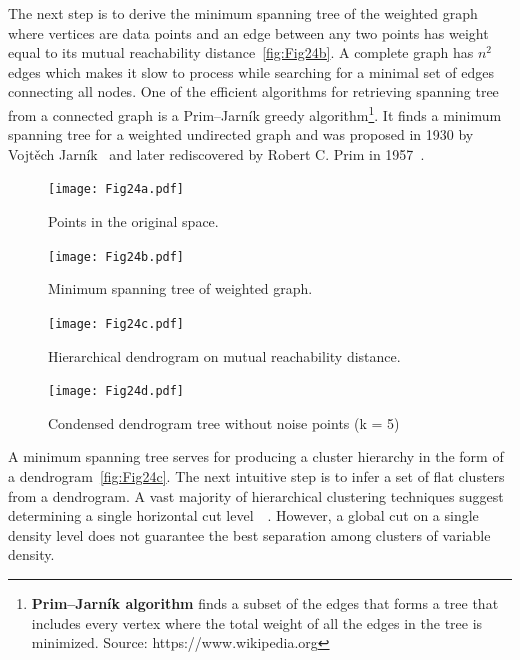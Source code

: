 The next step is to derive the minimum spanning tree of the weighted graph where vertices are data points and an edge between any two points has weight equal to its mutual reachability distance~\autoref{fig:Fig24b}. A complete graph has $n^2$ edges which makes it slow to process while searching for a minimal set of edges connecting all nodes. One of the efficient algorithms for retrieving spanning tree from a connected graph is a Prim–Jarník greedy algorithm\footnote{\textbf{Prim–Jarník algorithm} finds a subset of the edges that forms a tree that includes every vertex where the total weight of all the edges in the tree is minimized. Source: https://www.wikipedia.org}. It finds a minimum spanning tree for a weighted undirected graph and was proposed in 1930 by Vojtěch Jarník~\cite{Jarnik1930SpanningTree} and later rediscovered by Robert C. Prim in 1957~\cite{Prim1957SpanningTree}.

\begin{figure}[H]
    \centering
    \begin{minipage}{0.42\textwidth}
        \centering
        \texttt{[image: Fig24a.pdf]}
        \caption{Points in the original space.}
        \label{fig:Fig24a}
    \end{minipage}\hfill
    \begin{minipage}{0.42\textwidth}
        \centering
        \texttt{[image: Fig24b.pdf]} 
        \caption{Minimum spanning tree of weighted graph.}
        \label{fig:Fig24b}
    \end{minipage}
\end{figure}
\begin{figure}[H]
    \centering
    \begin{minipage}{0.42\textwidth}
        \centering
        \texttt{[image: Fig24c.pdf]}
        \caption{Hierarchical dendrogram on mutual reachability distance.}
        \label{fig:Fig24c}
    \end{minipage}\hfill
    \begin{minipage}{0.42\textwidth}
        \centering
        \texttt{[image: Fig24d.pdf]} 
        \caption{Condensed dendrogram tree without noise points (k = 5)}
        \label{fig:Fig24d}
    \end{minipage}
\end{figure}

A minimum spanning tree serves for producing a cluster hierarchy in the form of a dendrogram~\autoref{fig:Fig24c}. The next intuitive step is to infer a set of flat clusters from a dendrogram. A vast majority of hierarchical clustering techniques suggest determining a single horizontal cut level~\cite{DBSCAN}~\cite{OPTICS1999Ankerst}. However, a global cut on a single density level does not guarantee the best separation among clusters of variable density. 

